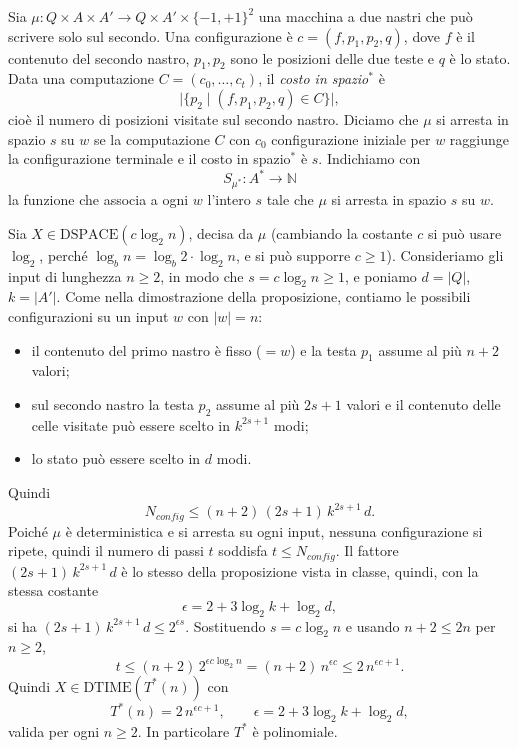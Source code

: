 \begin{sol}
Sia $\mu\colon Q\times A\times A'\to Q\times A'\times\{-1,+1\}^2$ una macchina a due nastri che può scrivere solo sul secondo. Una configurazione è $c=(f,p_1,p_2,q)$, dove $f$ è il contenuto del secondo nastro, $p_1,p_2$ sono le posizioni delle due teste e $q$ è lo stato. Data una computazione $C=(c_0,\dots,c_t)$, il \emph{costo in spazio$^*$} è
\[
\big|\{p_2\mid (f,p_1,p_2,q)\in C\}\big|,
\]
cioè il numero di posizioni visitate sul secondo nastro. Diciamo che $\mu$ si arresta in spazio $s$ su $w$ se la computazione $C$ con $c_0$ configurazione iniziale per $w$ raggiunge la configurazione terminale e il costo in spazio$^*$ è $s$. Indichiamo con
\[
S_{\mu^*}\colon A^*\to\mathbb N
\]
la funzione che associa a ogni $w$ l'intero $s$ tale che $\mu$ si arresta in spazio $s$ su $w$.

Sia $X\in\mathrm{DSPACE}(c\log_2 n)$, decisa da $\mu$ (cambiando la costante $c$ si può usare $\log_2$, perché $\log_b n=\log_b 2\cdot\log_2 n$, e si può supporre $c\ge 1$). Consideriamo gli input di lunghezza $n\ge2$, in modo che $s=c\log_2 n\ge 1$, e poniamo $d=|Q|$, $k=|A'|$. Come nella dimostrazione della proposizione, contiamo le possibili configurazioni su un input $w$ con $|w|=n$:
\begin{itemize}
    \item il contenuto del primo nastro è fisso ($=w$) e la testa $p_1$ assume al più $n+2$ valori;
    \item sul secondo nastro la testa $p_2$ assume al più $2s+1$ valori e il contenuto delle celle visitate può essere scelto in $k^{2s+1}$ modi;
    \item lo stato può essere scelto in $d$ modi.
\end{itemize}
Quindi
\[
N_{config}\le (n+2)\,(2s+1)\,k^{2s+1}\,d.
\]
Poiché $\mu$ è deterministica e si arresta su ogni input, nessuna configurazione si ripete, quindi il numero di passi $t$ soddisfa $t\le N_{config}$.
Il fattore $(2s+1)\,k^{2s+1}\,d$ è lo stesso della proposizione vista in classe, quindi, con la stessa costante
\[
\epsilon=2+3\log_2 k+\log_2 d,
\]
si ha $(2s+1)\,k^{2s+1}\,d\le 2^{\epsilon s}$. Sostituendo $s=c\log_2 n$ e usando $n+2\le 2n$ per $n\ge 2$,
\[
t\le (n+2)\,2^{\epsilon c\log_2 n}=(n+2)\,n^{\epsilon c}\le 2\,n^{\epsilon c+1}.
\]
Quindi $X\in\mathrm{DTIME}(T^*(n))$ con
\[
T^*(n)=2\,n^{\epsilon c+1},\qquad \epsilon=2+3\log_2 k+\log_2 d,
\]
valida per ogni $n\ge 2$. In particolare $T^*$ è polinomiale.
\end{sol}
\newpage


